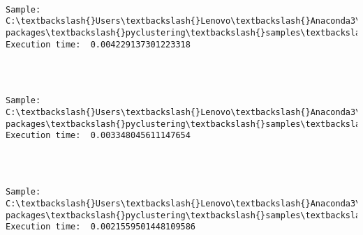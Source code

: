 \documentclass[11pt]{article}
\begin{document}
    \begin{center}
    \end{center}
    { \hspace*{\fill} \\}
    
    \begin{Verbatim}[commandchars=\\\{\}]
Sample:  C:\textbackslash{}Users\textbackslash{}Lenovo\textbackslash{}Anaconda3\textbackslash{}lib\textbackslash{}site-packages\textbackslash{}pyclustering\textbackslash{}samples\textbackslash{}samples\textbackslash{}simple\textbackslash{}Simple04.data 		Execution time:  0.004229137301223318 


    \end{Verbatim}

    \begin{center}
    \end{center}
    { \hspace*{\fill} \\}
    
    \begin{Verbatim}[commandchars=\\\{\}]
Sample:  C:\textbackslash{}Users\textbackslash{}Lenovo\textbackslash{}Anaconda3\textbackslash{}lib\textbackslash{}site-packages\textbackslash{}pyclustering\textbackslash{}samples\textbackslash{}samples\textbackslash{}simple\textbackslash{}Simple05.data 		Execution time:  0.003348045611147654 


    \end{Verbatim}

    \begin{center}
    \end{center}
    { \hspace*{\fill} \\}
    
    \begin{Verbatim}[commandchars=\\\{\}]
Sample:  C:\textbackslash{}Users\textbackslash{}Lenovo\textbackslash{}Anaconda3\textbackslash{}lib\textbackslash{}site-packages\textbackslash{}pyclustering\textbackslash{}samples\textbackslash{}samples\textbackslash{}simple\textbackslash{}Simple06.data 		Execution time:  0.0021559501448109586 


    \end{Verbatim}
\end{document}
